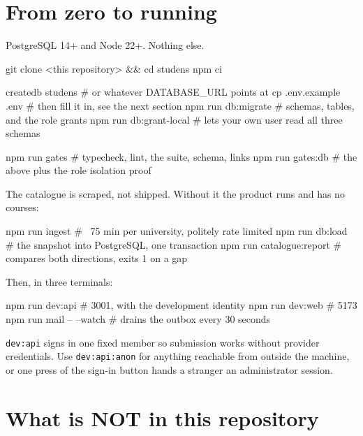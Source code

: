 \documentclass[11pt,a4paper]{article}
\begin{document}
\section{From zero to running}

PostgreSQL 14+ and Node 22+. Nothing else.

\begin{cmd}
git clone <this repository> && cd studens
npm ci

createdb studens              # or whatever DATABASE_URL points at
cp .env.example .env          # then fill it in, see the next section
npm run db:migrate            # schemas, tables, and the role grants
npm run db:grant-local        # lets your own user read all three schemas

npm run gates                 # typecheck, lint, the suite, schema, links
npm run gates:db              # the above plus the role isolation proof
\end{cmd}

The catalogue is scraped, not shipped. Without it the product runs and has no
courses:

\begin{cmd}
npm run ingest                # ~75 min per university, politely rate limited
npm run db:load               # the snapshot into PostgreSQL, one transaction
npm run catalogue:report      # compares both directions, exits 1 on a gap
\end{cmd}

Then, in three terminals:

\begin{cmd}
npm run dev:api               # 3001, with the development identity
npm run dev:web               # 5173
npm run mail -- --watch       # drains the outbox every 30 seconds
\end{cmd}

\begin{careful}
\texttt{dev:api} signs in one fixed member so submission works without provider
credentials. Use \texttt{dev:api:anon} for anything reachable from outside the
machine, or one press of the sign-in button hands a stranger an administrator
session.
\end{careful}

\newpage
\section{What is NOT in this repository}
\end{document}

